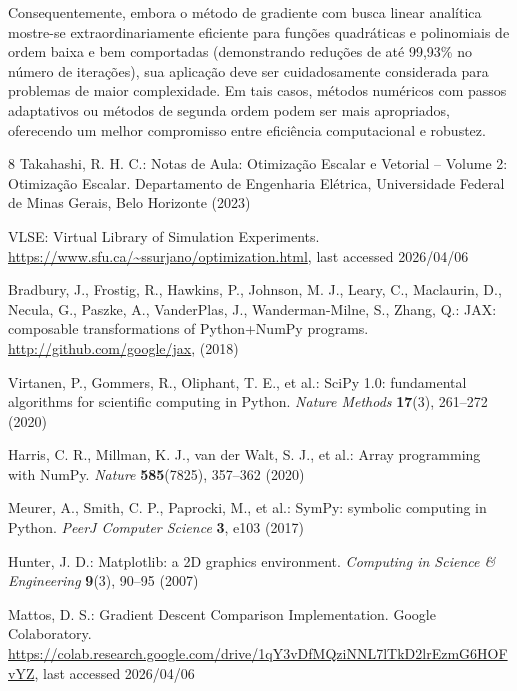 \documentclass[runningheads]{llncs}
\begin{document}
Consequentemente, embora o método de gradiente com busca linear analítica mostre-se extraordinariamente eficiente para funções quadráticas e polinomiais de ordem baixa e bem comportadas (demonstrando reduções de até 99,93\% no número de iterações), sua aplicação deve ser cuidadosamente considerada para problemas de maior complexidade. Em tais casos, métodos numéricos com passos adaptativos ou métodos de segunda ordem podem ser mais apropriados, oferecendo um melhor compromisso entre eficiência computacional e robustez.

%
%
%
% 
% 
%
\begin{thebibliography}{8}
Takahashi, R. H. C.: Notas de Aula: Otimização Escalar e Vetorial -- Volume 2: Otimização Escalar. Departamento de Engenharia Elétrica, Universidade Federal de Minas Gerais, Belo Horizonte (2023)

VLSE: Virtual Library of Simulation Experiments. \url{https://www.sfu.ca/~ssurjano/optimization.html}, last accessed 2026/04/06

Bradbury, J., Frostig, R., Hawkins, P., Johnson, M. J., Leary, C., Maclaurin, D., Necula, G., Paszke, A., VanderPlas, J., Wanderman-Milne, S., Zhang, Q.: JAX: composable transformations of Python+NumPy programs. \url{http://github.com/google/jax}, (2018)

Virtanen, P., Gommers, R., Oliphant, T. E., et al.: SciPy 1.0: fundamental algorithms for scientific computing in Python. \textit{Nature Methods} \textbf{17}(3), 261--272 (2020)

Harris, C. R., Millman, K. J., van der Walt, S. J., et al.: Array programming with NumPy. \textit{Nature} \textbf{585}(7825), 357--362 (2020)

Meurer, A., Smith, C. P., Paprocki, M., et al.: SymPy: symbolic computing in Python. \textit{PeerJ Computer Science} \textbf{3}, e103 (2017)

Hunter, J. D.: Matplotlib: a 2D graphics environment. \textit{Computing in Science \& Engineering} \textbf{9}(3), 90--95 (2007)

Mattos, D. S.: Gradient Descent Comparison Implementation. Google Colaboratory. \url{https://colab.research.google.com/drive/1qY3vDfMQziNNL7lTkD2lrEzmG6HOFvYZ}, last accessed 2026/04/06
\end{thebibliography}
\end{document}
